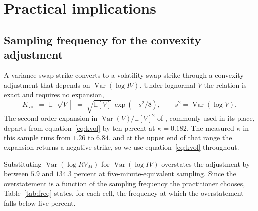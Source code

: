 \section{Practical implications}\label{sec:practical}

\subsection{Sampling frequency for the convexity adjustment}

A variance swap strike converts to a volatility swap strike through a convexity
adjustment that depends on $\operatorname{Var}(\log IV)$. Under lognormal $V$ the
relation is exact and requires no expansion,
\begin{equation}\label{eq:kvol}
K_{\mathrm{vol}} \;=\; \mathbb{E}\!\left[\sqrt{V}\right] \;=\; \sqrt{\mathbb{E}[V]}\,
\exp\!\left(-s^{2}/8\right), \qquad s^{2} = \operatorname{Var}(\log V).
\end{equation}
The second-order expansion in $\operatorname{Var}(V)/\mathbb{E}[V]^{2}$ of
\citet{brockhaus2000}, commonly used in its place, departs from
equation~\eqref{eq:kvol} by ten percent at $\kappa = 0.182$. The measured $\kappa$ %
in this sample runs from $1.26$ to $6.84$, and at the upper end of that range the %
expansion returns a negative strike, so we use equation~\eqref{eq:kvol}
throughout.

Substituting $\operatorname{Var}(\log RV_M)$ for $\operatorname{Var}(\log IV)$
overstates the adjustment by between $5.9$ and $134.3$ percent at %
five-minute-equivalent sampling. Since the overstatement is a function of the
sampling frequency the practitioner chooses, Table~\ref{tab:freq} states, for
each cell, the frequency at which the overstatement falls below five percent.

